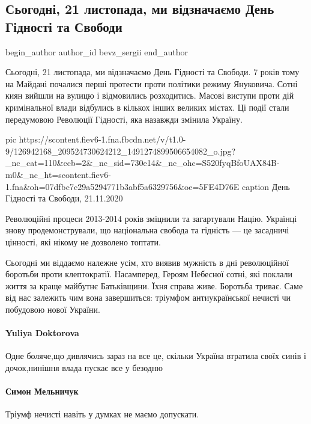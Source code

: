  
 
 
 
 
 
\subsection{Сьогодні, 21 листопада, ми відзначаємо День Гідності та Свободи}
\label{sec:21_11_2020.fb.bevz_sergii.1.den_gidnosti}
\ifcmt
	begin_author
   author_id bevz_sergii
	end_author
\fi

Сьогодні, 21 листопада, ми відзначаємо День Гідності та Свободи. 7 років тому
на Майдані почалися перші протести проти політики режиму Януковича. Сотні киян
вийшли на вулицю і відмовились розходитись. Масові виступи проти дій
кримінальної влади відбулись в кількох інших великих містах. Ці події стали
передумовою Революції Гідності, яка назавжди змінила Україну. 

\ifcmt
pic https://scontent.fiev6-1.fna.fbcdn.net/v/t1.0-9/126942168_209524730624212_1491274899506654082_o.jpg?_nc_cat=110&ccb=2&_nc_sid=730e14&_nc_ohc=S520fyqBfoUAX84B-m0&_nc_ht=scontent.fiev6-1.fna&oh=07dfbc7c29a5294771b3abf5a6329756&oe=5FE4D76E
caption День Гідності та Свободи, 21.11.2020
\fi

Революційні процеси 2013-2014 років зміцнили та загартували Націю. Українці
знову продемонстрували, що національна свобода та гідність --- це засадничі
цінності, які нікому не дозволено топтати. 

Сьогодні ми віддаємо належне усім, хто виявив мужність в дні революційної
боротьби проти клептократії. Насамперед, Героям Небесної сотні, які поклали
життя за краще майбутнє Батьківщини. Їхня справа живе. Боротьба триває. Саме
від нас залежить чим вона завершиться: тріумфом антиукраїнської нечисті чи
побудовою нової України.

\paragraph{Yuliya Doktorova}
Одне боляче,що дивлячись зараз на все це, скільки Україна втратила своїх синів
і дочок,нинішня влада пускає все у безодню 

\paragraph{Симон Мельничук}
Тріумф нечисті навіть у думках не маємо допускати.
